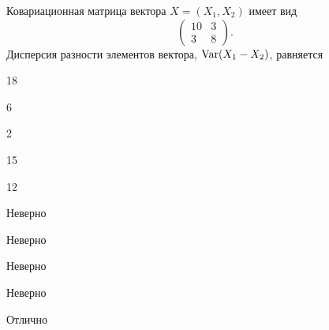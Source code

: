 
\begin{question}
Ковариационная матрица вектора \(X=(X_1, X_2)\) имеет вид \[
\begin{pmatrix}
10 & 3 \\
3 & 8
\end{pmatrix}.
\] Дисперсия разности элементов вектора, \(\operatorname{Var}(X_1-X_2)\), равняется
\begin{answerlist}
  \item 18
  \item 6
  \item 2
  \item 15
  \item 12
\end{answerlist}
\end{question}

\begin{solution}
\begin{answerlist}
  \item Неверно
  \item Неверно
  \item Неверно
  \item Неверно
  \item Отлично
\end{answerlist}
\end{solution}

